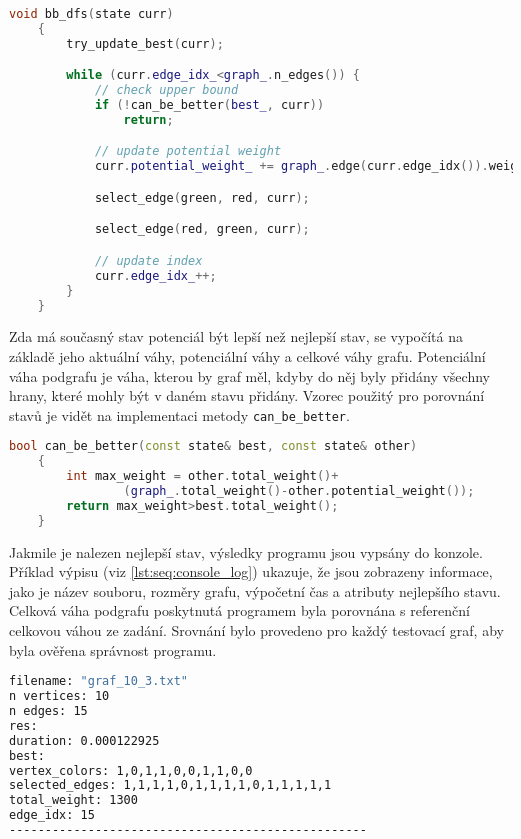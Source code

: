 \begin{lstlisting}[language=C++, label={lst:bb_dfs}, title={Metoda pro prohledávání stavového prostoru}]
    void bb_dfs(state curr)
    {
        try_update_best(curr);

        while (curr.edge_idx_<graph_.n_edges()) {
            // check upper bound
            if (!can_be_better(best_, curr))
                return;

            // update potential weight
            curr.potential_weight_ += graph_.edge(curr.edge_idx()).weight;

            select_edge(green, red, curr);

            select_edge(red, green, curr);

            // update index
            curr.edge_idx_++;
        }
    }
\end{lstlisting}

Zda má současný stav potenciál být lepší než nejlepší stav, se vypočítá na základě jeho aktuální váhy, potenciální váhy a celkové váhy grafu.
Potenciální váha podgrafu je váha, kterou by graf měl, kdyby do něj byly přidány všechny hrany, které mohly být v daném stavu přidány.
Vzorec použitý pro porovnání stavů je vidět na implementaci metody \texttt{can\_be\_better}.

\begin{lstlisting}[language=C++, label={lst:can_be_better}, title={Metoda pro ořezávání shora}]
    bool can_be_better(const state& best, const state& other)
    {
        int max_weight = other.total_weight()+
                (graph_.total_weight()-other.potential_weight());
        return max_weight>best.total_weight();
    }
\end{lstlisting}

Jakmile je nalezen nejlepší stav, výsledky programu jsou vypsány do konzole.
Příklad výpisu (viz \ref{lst:seq:console_log}) ukazuje, že jsou zobrazeny informace, jako je název souboru, rozměry grafu, výpočetní čas a atributy nejlepšího stavu.
Celková váha podgrafu poskytnutá programem byla porovnána s referenční celkovou váhou ze zadání.
Srovnání bylo provedeno pro každý testovací graf, aby byla ověřena správnost programu.

\begin{lstlisting}[language=bash, label={lst:seq:console_log}, title={Příklad výpisu výsledků}]
filename: "graf_10_3.txt"
n vertices: 10
n edges: 15
res:
duration: 0.000122925
best:
vertex_colors: 1,0,1,1,0,0,1,1,0,0
selected_edges: 1,1,1,1,0,1,1,1,1,0,1,1,1,1,1
total_weight: 1300
edge_idx: 15
--------------------------------------------------
\end{lstlisting}






